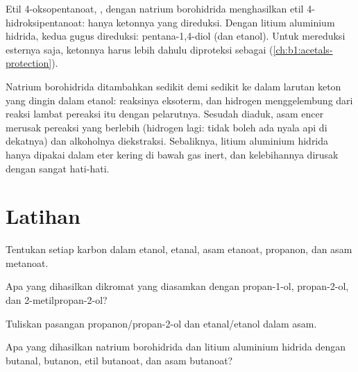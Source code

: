 \begin{example}\label{ex:b1:organic-redox:ketoester}
Etil 4-oksopentanoat, , dengan natrium borohidrida
menghasilkan etil 4-hidroksipentanoat: hanya ketonnya yang direduksi.
Dengan litium aluminium hidrida, kedua gugus direduksi: pentana-1,4-diol
(dan etanol). Untuk mereduksi esternya saja, ketonnya harus lebih dahulu
diproteksi sebagai  (\cref{ch:b1:acetals-protection}).
\end{example}

\begin{inthelab}
Natrium borohidrida ditambahkan sedikit demi sedikit ke dalam larutan
keton yang dingin dalam etanol: reaksinya eksoterm, dan hidrogen
menggelembung dari reaksi lambat pereaksi itu dengan pelarutnya. Sesudah
diaduk, asam encer merusak pereaksi yang berlebih (hidrogen lagi: tidak
boleh ada nyala api di dekatnya) dan alkoholnya diekstraksi. Sebaliknya,
litium aluminium hidrida hanya dipakai dalam eter kering di bawah gas
inert, dan kelebihannya dirusak dengan sangat hati-hati.
\end{inthelab}

\section{Latihan}

\begin{exercise}[$\star$]\label{exo:b1:organic-redox:1}
Tentukan  setiap karbon dalam etanol, etanal, asam
etanoat, propanon, dan asam metanoat.
\end{exercise}

\begin{exercise}[$\star$]\label{exo:b1:organic-redox:2}
Apa yang dihasilkan dikromat yang diasamkan dengan propan-1-ol,
propan-2-ol, dan 2-metilpropan-2-ol?
\end{exercise}

\begin{exercise}[$\star$]\label{exo:b1:organic-redox:3}
Tuliskan  pasangan propanon/propan-2-ol dan etanal/etanol
dalam asam.
\end{exercise}

\begin{exercise}[$\star$]\label{exo:b1:organic-redox:4}
Apa yang dihasilkan natrium borohidrida dan litium aluminium hidrida
dengan butanal, butanon, etil butanoat, dan asam butanoat?
\end{exercise}

